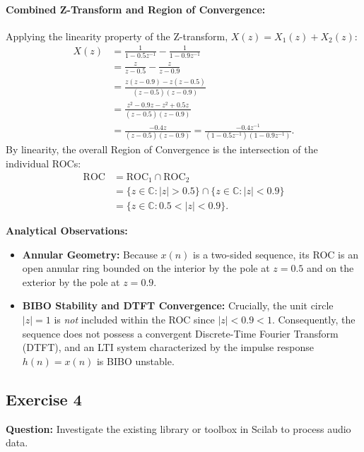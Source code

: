 \documentclass[12pt,a4paper]{article}
\begin{document}
\paragraph{Combined Z-Transform and Region of Convergence:}
Applying the linearity property of the Z-transform, $X(z) = X_1(z) + X_2(z)$:
\begin{align*}
    X(z) &= \frac{1}{1 - 0.5 z^{-1}} - \frac{1}{1 - 0.9 z^{-1}} \\
    &= \frac{z}{z - 0.5} - \frac{z}{z - 0.9} \\
    &= \frac{z(z - 0.9) - z(z - 0.5)}{(z - 0.5)(z - 0.9)} \\
    &= \frac{z^2 - 0.9z - z^2 + 0.5z}{(z - 0.5)(z - 0.9)} \\
    &= \frac{-0.4z}{(z - 0.5)(z - 0.9)} = \frac{-0.4 z^{-1}}{(1 - 0.5 z^{-1})(1 - 0.9 z^{-1})}.
\end{align*}
By linearity, the overall Region of Convergence is the intersection of the individual ROCs:
\begin{align*}
    \text{ROC} &= \text{ROC}_1 \cap \text{ROC}_2 \\
    &= \{z \in \mathbb{C} : |z| > 0.5\} \cap \{z \in \mathbb{C} : |z| < 0.9\} \\
    &= \{z \in \mathbb{C} : 0.5 < |z| < 0.9\}.
\end{align*}

\noindent\textbf{Analytical Observations:}
\begin{itemize}
    \item \textbf{Annular Geometry:} Because $x(n)$ is a two-sided sequence, its ROC is an open annular ring bounded on the interior by the pole at $z = 0.5$ and on the exterior by the pole at $z = 0.9$.
    \item \textbf{BIBO Stability and DTFT Convergence:} Crucially, the unit circle $|z| = 1$ is \emph{not} included within the ROC since $|z| < 0.9 < 1$. Consequently, the sequence does not possess a convergent Discrete-Time Fourier Transform (DTFT), and an LTI system characterized by the impulse response $h(n) = x(n)$ is BIBO unstable.
\end{itemize}

\subsection{Exercise 4}\label{sec:ex4}
\noindent\textbf{Question:}
Investigate the existing library or toolbox in Scilab to process audio data.
\end{document}
